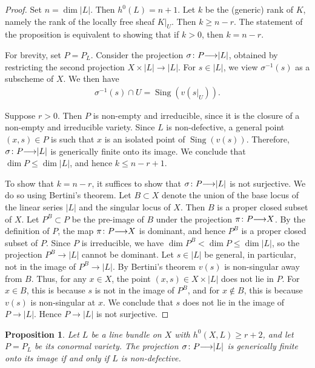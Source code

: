 \documentclass[11pt,reqno]{amsart}
\theoremstyle{plain}
\newtheorem{proposition}[theorem]{Proposition}
\theoremstyle{definition}
\theoremstyle{remark}
\numberwithin{equation}{section}
\DeclareMathOperator{\sing}{Sing}
\renewcommand{\to}{{\longrightarrow}}
\numberwithin{equation}{section}
\begin{document}
\begin{proof}
  Set $n = \dim |L|$.
  Then $h^0(L) = n+1$.
  Let $k$ be the (generic) rank of $K$, namely the rank of the locally free sheaf $K|_U$.
  Then $k \geq n-r$.
  The statement of the proposition is equivalent to showing that if $k > 0$, then $k = n-r$.

  For brevity, set $P = P_L$.
  Consider the projection $\sigma \from P \to |L|$, obtained by restricting the second projection $X \times |L| \to |L|$.
  For $s \in |L|$, we view $\sigma^{-1}(s)$ as a subscheme of $X$.
  We then have
  \begin{align*}
    \sigma^{-1}(s) \cap U = \sing(v(s|_U)).
  \end{align*}

  Suppose $r>0$.
  Then $P$ is non-empty and irreducible, since it is the closure of a non-empty and irreducible variety.
  Since $L$ is non-defective, a general point $(x,s) \in P$ is such that $x$ is an isolated point of $\sing(v(s))$.
  Therefore, $\sigma \from P \to |L|$ is generically finite onto its image.
  We conclude that $\dim P \leq \dim |L|$, and hence $k \leq n-r+1$.

  To show that $k = n-r$, it suffices to show that $\sigma \from P \to |L|$ is not surjective.
  We do so using Bertini's theorem.
  Let $B \subset X$ denote the union of the base locus of the linear series $|L|$ and the singular locus of $X$.
  Then $B$ is a proper closed subset of $X$.
  Let $P^B \subset P$ be the pre-image of $B$ under the projection $\pi \from P \to X$.
  By the definition of $P$, the map $\pi \from P \to X$ is dominant, and hence $P^B$ is a proper closed subset of $P$.
  Since $P$ is irreducible, we have $\dim P^B < \dim P \leq \dim |L|$, so the projection $P^B \to |L|$ cannot be dominant.
  Let $s \in |L|$ be general, in particular, not in the image of $P^B \to |L|$.
  By Bertini's theorem $v(s)$ is non-singular away from $B$.
  Thus, for any $x \in X$, the point $(x, s) \in X \times |L|$ does not lie in $P$.
  For $x \in B$, this is because $s$ is not in the image of $P^B$, and for $x \not \in B$, this is because $v(s)$ is non-singular at $x$.
  We conclude that $s$ does not lie in the image of $P \to |L|$.
  Hence $P \to |L|$ is not surjective.
\end{proof} 

\begin{proposition}
  \label{prop:dimensionCriterion}
  Let $L$ be a line bundle on $X$ with $h^{0}(X,L) \geq r+2$, and let $P = P_L$ be its conormal variety.
  The projection $\sigma\from P \to |L|$ is generically finite onto its image if and only if $L$ is non-defective. 
\end{proposition}
\end{document}
